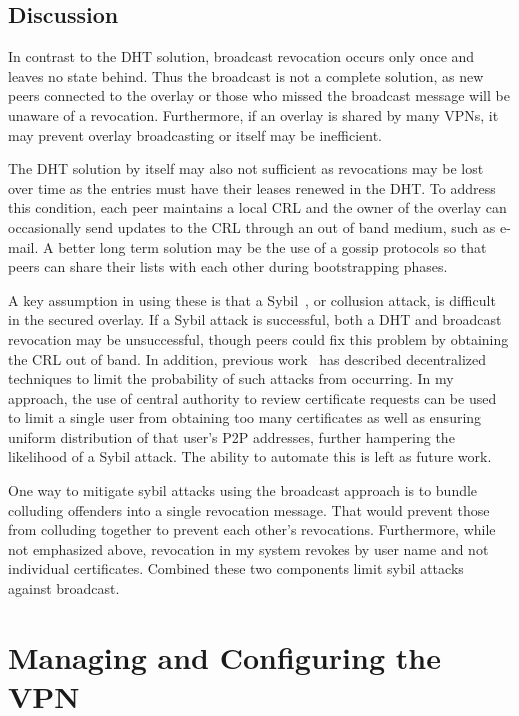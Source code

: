 \subsection{Discussion}

In contrast to the DHT solution, broadcast revocation occurs only once and
leaves no state behind.  Thus the broadcast is not a complete solution, as new
peers connected to the overlay or those who missed the broadcast message will
be unaware of a revocation.  Furthermore, if an overlay is shared by many VPNs,
it may prevent overlay broadcasting or itself may be inefficient.

The DHT solution by itself may also not sufficient as revocations may be lost
over time as the entries must have their leases renewed in the DHT.  To address
this condition, each peer maintains a local CRL and the owner of the overlay
can occasionally send updates to the CRL through an out of band medium, such as
e-mail.  A better long term solution may be the use of a gossip protocols so
that peers can share their lists with each other during bootstrapping phases.

A key assumption in using these is that a Sybil~\cite{sybil}, or collusion
attack, is difficult in the secured overlay.	 If a Sybil attack is successful,
both a DHT and broadcast revocation may be unsuccessful, though peers could fix
this problem by obtaining the CRL out of band.  In addition, previous
work~\cite{secure_routing} has described decentralized techniques to limit the
probability of such attacks from occurring.  In my approach, the use of central
authority to review certificate requests can be used to limit a single user
from obtaining too many certificates as well as ensuring uniform distribution
of that user's P2P addresses, further hampering the likelihood of a Sybil
attack.  The ability to automate this is left as future work.

One way to mitigate sybil attacks using the broadcast approach is to bundle
colluding offenders into a single revocation message.  That would prevent those
from colluding together to prevent each other's revocations.  Furthermore,
while not emphasized above, revocation in my system revokes by user name and
not individual certificates.  Combined these two components limit sybil attacks
against broadcast.

\section{Managing and Configuring the VPN}
\label{vpn:groupvpn}


